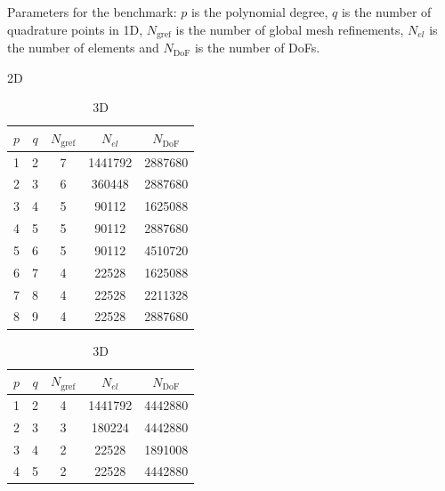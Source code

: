 \documentclass[AMA,STIX1COL]{WileyNJD-v2}
\begin{document}
%
\begin{table}[!htb]
  \caption{Parameters for the benchmark: $p$ is the polynomial degree,
  $q$ is the number of quadrature points in 1D, $N_{\text{gref}}$ is the number of global mesh refinements,
  $N_{el}$ is the number of elements and $N_{\text{DoF}}$ is the number of DoFs.}
  \begin{subtable}{.49\linewidth}
  \caption{2D}
  \label{tab:input_parameters_2d}
  \centering
  \begin{tabular}{ccccc}
  \hline
    $p$ & $q$ & $N_{\text{gref}}$ & $N_{el}$ & $N_{\text{DoF}}$ \\
  \hline
    1 & 2 & 7 & 1441792 & 2887680 \\
    2 & 3 & 6 & 360448 & 2887680 \\
    3 & 4 & 5 & 90112 & 1625088 \\
    4 & 5 & 5 & 90112 & 2887680 \\
    5 & 6 & 5 & 90112 & 4510720 \\
    6 & 7 & 4 & 22528 & 1625088 \\
    7 & 8 & 4 & 22528 & 2211328 \\
    8 & 9 & 4 & 22528 & 2887680 \\
  \hline
  \end{tabular}
  \end{subtable}
  \begin{subtable}{.49\linewidth}
  \caption{3D}
  \label{tab:input_parameters_3d}
  \centering
  \begin{tabular}{ccccc}
  \hline
    $p$ & $q$ & $N_{\text{gref}}$ & $N_{el}$ & $N_{\text{DoF}}$ \\
  \hline
    1 & 2 & 4 & 1441792 & 4442880 \\
    2 & 3 & 3 & 180224 & 4442880 \\
    3 & 4 & 2 & 22528 & 1891008 \\
    4 & 5 & 2 & 22528 & 4442880 \\
  \hline
  \end{tabular}
  \end{subtable}
\end{table}
\end{document}
